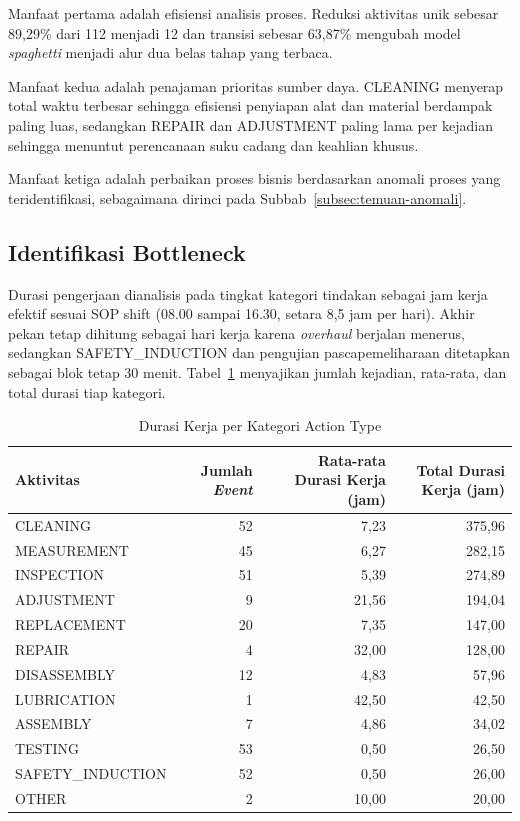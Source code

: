Manfaat pertama adalah efisiensi analisis proses. Reduksi aktivitas unik sebesar 89,29\% dari 112 menjadi 12 dan transisi sebesar 63,87\% mengubah model \textit{spaghetti} menjadi alur dua belas tahap yang terbaca.

Manfaat kedua adalah penajaman prioritas sumber daya. CLEANING menyerap total waktu terbesar sehingga efisiensi penyiapan alat dan material berdampak paling luas, sedangkan REPAIR dan ADJUSTMENT paling lama per kejadian sehingga menuntut perencanaan suku cadang dan keahlian khusus.

Manfaat ketiga adalah perbaikan proses bisnis berdasarkan anomali proses yang teridentifikasi, sebagaimana dirinci pada Subbab~\ref{subsec:temuan-anomali}.

\subsection{Identifikasi Bottleneck}
\label{subsec:identifikasi-bottleneck}

Durasi pengerjaan dianalisis pada tingkat kategori tindakan sebagai jam kerja efektif sesuai SOP shift (08.00 sampai 16.30, setara 8,5 jam per hari). Akhir pekan tetap dihitung sebagai hari kerja karena \textit{overhaul} berjalan menerus, sedangkan SAFETY\_INDUCTION dan pengujian pascapemeliharaan ditetapkan sebagai blok tetap 30 menit. Tabel~\ref{tab:durasi-kategori} menyajikan jumlah kejadian, rata-rata, dan total durasi tiap kategori.

\begin{table}[H]
\centering
\caption{Durasi Kerja per Kategori Action Type}
\label{tab:durasi-kategori}
\footnotesize
\setlength{\tabcolsep}{5pt}
\renewcommand{\arraystretch}{1.05}
\begin{tabular}{@{}l r r r@{}}
\toprule
\textbf{Aktivitas} & \textbf{Jumlah \textit{Event}} & \textbf{Rata-rata Durasi Kerja (jam)} & \textbf{Total Durasi Kerja (jam)} \\
\midrule
CLEANING & 52 & 7,23 & 375,96 \\
MEASUREMENT & 45 & 6,27 & 282,15 \\
INSPECTION & 51 & 5,39 & 274,89 \\
ADJUSTMENT & 9 & 21,56 & 194,04 \\
REPLACEMENT & 20 & 7,35 & 147,00 \\
REPAIR & 4 & 32,00 & 128,00 \\
DISASSEMBLY & 12 & 4,83 & 57,96 \\
LUBRICATION & 1 & 42,50 & 42,50 \\
ASSEMBLY & 7 & 4,86 & 34,02 \\
TESTING & 53 & 0,50 & 26,50 \\
SAFETY\_INDUCTION & 52 & 0,50 & 26,00 \\
OTHER & 2 & 10,00 & 20,00 \\
\bottomrule
\end{tabular}
\end{table}

